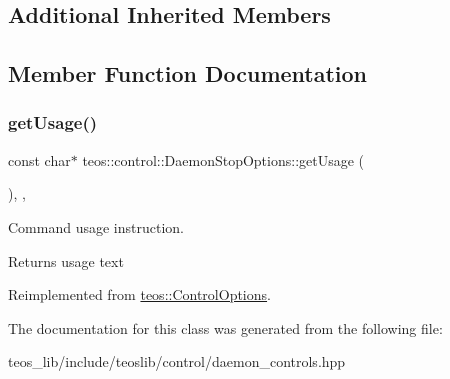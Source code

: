 \subsection*{Additional Inherited Members}


\subsection{Member Function Documentation}
\mbox{\label{classteos_1_1control_1_1_daemon_stop_options_a99e7d5a47cd20e4ad437049263cd367a}} 
\subsubsection{\texorpdfstring{get\+Usage()}{getUsage()}}
{\footnotesize\ttfamily const char$\ast$ teos\+::control\+::\+Daemon\+Stop\+Options\+::get\+Usage (\begin{DoxyParamCaption}{ }\end{DoxyParamCaption})\hspace{0.3cm}{\ttfamily [inline]}, {\ttfamily [protected]}, {\ttfamily [virtual]}}



Command \textquotesingle{}usage\textquotesingle{} instruction. 

\begin{DoxyReturn}{Returns}
usage text 
\end{DoxyReturn}


Reimplemented from \mbox{\hyperlink{classteos_1_1_control_options_a0aa5671f9bc750ed5280c26c543874f3}{teos\+::\+Control\+Options}}.



The documentation for this class was generated from the following file\+:\begin{DoxyCompactItemize}
\item 
teos\+\_\+lib/include/teoslib/control/daemon\+\_\+controls.\+hpp\end{DoxyCompactItemize}
